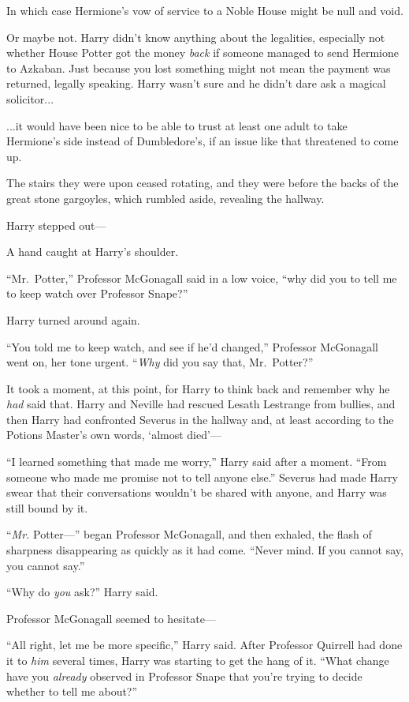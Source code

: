 In which case Hermione’s vow of service to a Noble House might be null and void.

Or maybe not. Harry didn’t know anything about the legalities, especially not whether House Potter got the money \emph{back} if someone managed to send Hermione to Azkaban. Just because you lost something might not mean the payment was returned, legally speaking. Harry wasn’t sure and he didn’t dare ask a magical solicitor...

...it would have been nice to be able to trust at least one adult to take Hermione’s side instead of Dumbledore’s, if an issue like that threatened to come up.

The stairs they were upon ceased rotating, and they were before the backs of the great stone gargoyles, which rumbled aside, revealing the hallway.

Harry stepped out—

A hand caught at Harry’s shoulder.

“Mr.~Potter,” Professor McGonagall said in a low voice, “why did you to tell me to keep watch over Professor Snape?”

Harry turned around again.

“You told me to keep watch, and see if he’d changed,” Professor McGonagall went on, her tone urgent. “\emph{Why} did you say that, Mr.~Potter?”

It took a moment, at this point, for Harry to think back and remember why he \emph{had} said that. Harry and Neville had rescued Lesath Lestrange from bullies, and then Harry had confronted Severus in the hallway and, at least according to the Potions Master’s own words, ‘almost died’—

“I learned something that made me worry,” Harry said after a moment. “From someone who made me promise not to tell anyone else.” Severus had made Harry swear that their conversations wouldn’t be shared with anyone, and Harry was still bound by it.

“\emph{Mr.} Potter—” began Professor McGonagall, and then exhaled, the flash of sharpness disappearing as quickly as it had come. “Never mind. If you cannot say, you cannot say.”

“Why do \emph{you} ask?” Harry said.

Professor McGonagall seemed to hesitate—

“All right, let me be more specific,” Harry said. After Professor Quirrell had done it to \emph{him} several times, Harry was starting to get the hang of it. “What change have you \emph{already} observed in Professor Snape that you’re trying to decide whether to tell me about?”


